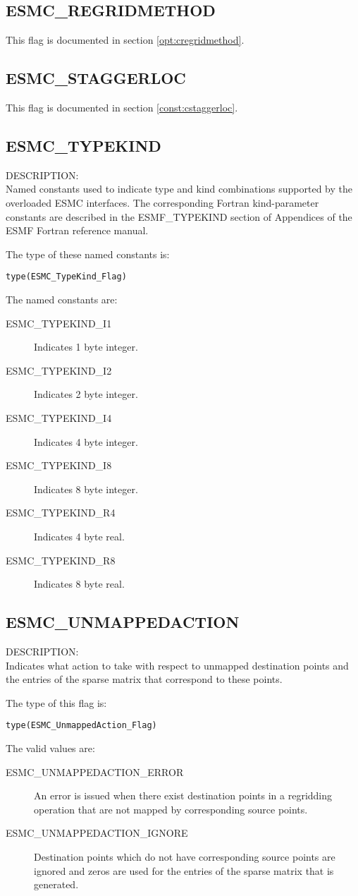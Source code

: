 \subsection{ESMC\_REGRIDMETHOD}
This flag is documented in section \ref{opt:cregridmethod}.

\subsection{ESMC\_STAGGERLOC}
This flag is documented in section \ref{const:cstaggerloc}.

\subsection{ESMC\_TYPEKIND}
\label{const:ctypekind}

{\sf DESCRIPTION:\\}
Named constants used to indicate type and kind combinations supported by the
overloaded ESMC interfaces. The corresponding Fortran kind-parameter constants 
are described in the ESMF\_TYPEKIND section of Appendices of the ESMF Fortran 
reference manual.

The type of these named constants is:

{\tt type(ESMC\_TypeKind\_Flag)}

The named constants are:
\begin{description}
\item [ESMC\_TYPEKIND\_I1]
      Indicates 1 byte integer.
\item [ESMC\_TYPEKIND\_I2]
      Indicates 2 byte integer.
\item [ESMC\_TYPEKIND\_I4]
      Indicates 4 byte integer.
\item [ESMC\_TYPEKIND\_I8]
      Indicates 8 byte integer.
\item [ESMC\_TYPEKIND\_R4]
      Indicates 4 byte real.
\item [ESMC\_TYPEKIND\_R8]
      Indicates 8 byte real.
\end{description}

\subsection{ESMC\_UNMAPPEDACTION}
\label{const:unmappedaction}
{\sf DESCRIPTION:\\}
Indicates what action to take with respect to unmapped destination points
and the entries of the sparse matrix that correspond to these points.

The type of this flag is:

{\tt type(ESMC\_UnmappedAction\_Flag)}

The valid values are:
\begin{description}
	\item[ESMC\_UNMAPPEDACTION\_ERROR]
	An error is issued when there exist destination points in a regridding
	operation that are not mapped by corresponding source points.
	\item[ESMC\_UNMAPPEDACTION\_IGNORE]
	Destination points which do not have corresponding source points are 
	ignored and zeros are used for the entries of the sparse matrix
	that is generated.
\end{description}

